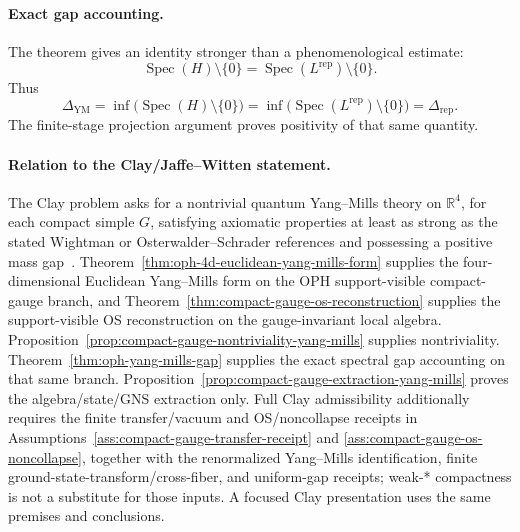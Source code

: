 \paragraph{Exact gap accounting.}
The theorem gives an identity stronger than a phenomenological estimate:
\[
\operatorname{Spec}(H)\setminus\{0\}
=
\operatorname{Spec}(L^{\mathrm{rep}})\setminus\{0\}.
\]
Thus
\[
\Delta_{\mathrm{YM}}
=
\inf\bigl(\operatorname{Spec}(H)\setminus\{0\}\bigr)
=
\inf\bigl(\operatorname{Spec}(L^{\mathrm{rep}})\setminus\{0\}\bigr)
=
\Delta_{\mathrm{rep}}.
\]
The finite-stage projection argument proves positivity of that same quantity.

\paragraph{Relation to the Clay/Jaffe--Witten statement.}
The Clay problem asks for a nontrivial quantum Yang--Mills theory on \(\mathbb R^4\), for each
compact simple \(G\), satisfying axiomatic properties at least as strong as the stated Wightman or
Osterwalder--Schrader references and possessing a positive mass gap~\cite{jaffeWittenYM,clayYM}.
Theorem~\ref{thm:oph-4d-euclidean-yang-mills-form} supplies the four-dimensional Euclidean
Yang--Mills form on the OPH support-visible compact-gauge branch, and
Theorem~\ref{thm:compact-gauge-os-reconstruction} supplies the support-visible OS reconstruction
on the gauge-invariant local algebra. Proposition~\ref{prop:compact-gauge-nontriviality-yang-mills}
supplies nontriviality.
Theorem~\ref{thm:oph-yang-mills-gap} supplies the exact spectral gap accounting on that same
branch. Proposition~\ref{prop:compact-gauge-extraction-yang-mills} proves the algebra/state/GNS
extraction only. Full Clay admissibility additionally requires the finite transfer/vacuum and
OS/noncollapse receipts in Assumptions~\ref{ass:compact-gauge-transfer-receipt} and
\ref{ass:compact-gauge-os-noncollapse}, together with the renormalized Yang--Mills identification,
finite ground-state-transform/cross-fiber, and uniform-gap receipts; weak-* compactness is not a
substitute for those inputs.
A focused Clay presentation uses the same premises and conclusions.
\fi
